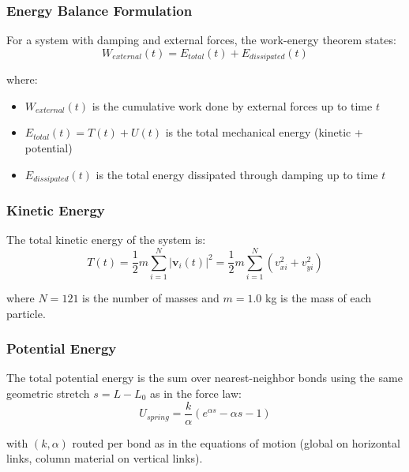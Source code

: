\documentclass[11pt,a4paper]{article}
\begin{document}
\subsubsection{Energy Balance Formulation}

\noindent For a system with damping and external forces, the work-energy theorem states:
\begin{equation}
W_{external}(t) = E_{total}(t) + E_{dissipated}(t)
\label{eq:work_energy}
\end{equation}

\noindent where:
\begin{itemize}
    \item $W_{external}(t)$ is the cumulative work done by external forces up to time $t$
    \item $E_{total}(t) = T(t) + U(t)$ is the total mechanical energy (kinetic + potential)
    \item $E_{dissipated}(t)$ is the total energy dissipated through damping up to time $t$
\end{itemize}

\subsubsection{Kinetic Energy}

\noindent The total kinetic energy of the system is:
\begin{equation}
T(t) = \frac{1}{2} m \sum_{i=1}^{N} |\mathbf{v}_i(t)|^2 = \frac{1}{2} m \sum_{i=1}^{N} (v_{xi}^2 + v_{yi}^2)
\label{eq:kinetic_energy}
\end{equation}

\noindent where $N = 121$ is the number of masses and $m = 1.0$ kg is the mass of each particle.

\subsubsection{Potential Energy}

\noindent The total potential energy is the sum over nearest-neighbor bonds using the same geometric stretch $s=L-L_0$ as in the force law:
\begin{equation}
U_{spring} = \frac{k}{\alpha} \left( e^{\alpha s} - \alpha s - 1 \right)
\end{equation}

\noindent with $(k,\alpha)$ routed per bond as in the equations of motion (global on horizontal links, column material on vertical links).
\end{document}
